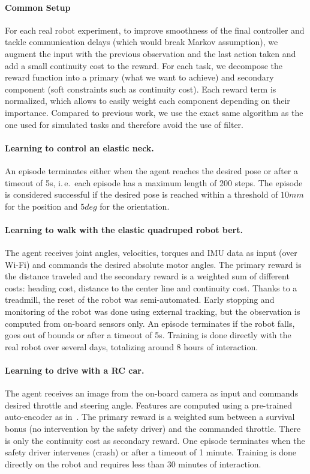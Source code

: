 \documentclass{article}
\newcommand{\ie}{i.\,e.\ }
\begin{document}
\paragraph{Common Setup}
For each real robot experiment, to improve smoothness of the final controller and tackle communication delays (which would break Markov assumption), we augment the input with the previous observation and the last action taken and add a small continuity cost to the reward.
For each task, we decompose the reward function into a primary (what we want to achieve) and secondary component (soft constraints such as continuity cost).
Each reward term is normalized, which allows to easily weight each component depending on their importance.
Compared to previous work, we use the exact same algorithm as the one used for simulated tasks and therefore avoid the use of filter.


\paragraph{Learning to control an elastic neck.}
An episode terminates either when the agent reaches the desired pose or after a timeout of 5s, \ie each episode has a maximum length of 200 steps. The episode is considered successful if the desired pose is reached within a threshold of $10 mm$ for the position and $5 deg$ for the orientation.


\paragraph{Learning to walk with the elastic quadruped robot bert.}
The agent receives joint angles, velocities, torques and IMU data as input (over Wi-Fi) and commands the desired absolute motor angles.
The primary reward is the distance traveled and the secondary reward is a weighted sum of different costs: heading cost, distance to the center line and continuity cost.
Thanks to a treadmill, the reset of the robot was semi-automated.
Early stopping and monitoring of the robot was done using external tracking, but the observation is computed from on-board sensors only.
An episode terminates if the robot falls, goes out of bounds or after a timeout of 5s.
Training is done directly with the real robot over several days, totalizing around 8 hours of interaction.


\paragraph{Learning to drive with a RC car.}
The agent receives an image from the on-board camera as input and commands desired throttle and steering angle.
Features are computed using a pre-trained auto-encoder as in~\citet{drive-smoothly-in-minutes}.
The primary reward is a weighted sum between a survival bonus (no intervention by the safety driver) and the commanded throttle.
There is only the continuity cost as secondary reward.
One episode terminates when the safety driver intervenes (crash) or after a timeout of 1 minute.
Training is done directly on the robot and requires less than 30 minutes of interaction.
\end{document}
